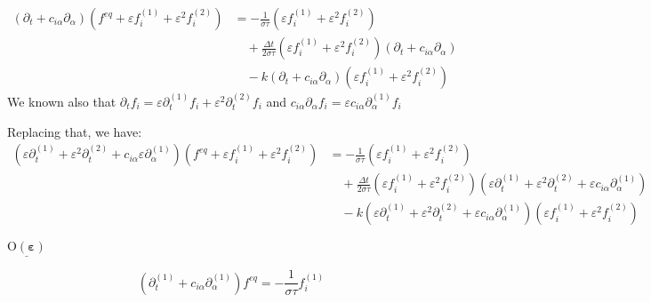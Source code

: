 \documentclass{article}
\newcommand{\Omicron}{\mathrm{O}}
\begin{document}
\begin{equation}
    \begin{aligned}
        ( \partial _{t} + c_{i\alpha } \partial _{\alpha })\left( f^{eq} + \varepsilon f_{i}^{( 1)} + \varepsilon ^{2} f_{i}^{( 2)}\right) 
        &= -\frac{1}{\sigma\tau }\left( \varepsilon f_{i}^{( 1)} + \varepsilon ^{2} f_{i}^{( 2)}\right) \\
        &\quad + \frac{ \Delta t}{2 \sigma\tau }\left( \varepsilon f_{i}^{( 1)} + \varepsilon ^{2} f_{i}^{( 2)}\right)( \partial _{t} + c_{i\alpha } \partial _{\alpha }) \\
        &\quad - k( \partial _{t} + c_{i\alpha } \partial _{\alpha })\left( \varepsilon f_{i}^{( 1)} + \varepsilon ^{2} f_{i}^{( 2)}\right)
    \end{aligned}
\end{equation}
We known also that $\partial _{t} f_{i} = \varepsilon \partial _{t}^{( 1)} f_{i} +\varepsilon ^{2} \partial _{t}^{( 2)} f_{i}$
and $c_{i\alpha } \partial _{\alpha } f_{i} =\varepsilon c_{i\alpha } \partial _{\alpha }^{( 1)} f_{i}$

Replacing that, we have:
\begin{equation}
    \begin{aligned}
        \left( \varepsilon \partial_{t}^{(1)} + \varepsilon^{2} \partial_{t}^{(2)} + c_{i\alpha} \varepsilon \partial_{\alpha}^{(1)} \right) 
        \left( f^{eq} + \varepsilon f_{i}^{(1)} + \varepsilon^{2} f_{i}^{(2)} \right) 
        &= -\frac{1}{\sigma\tau} \left( \varepsilon f_{i}^{(1)} + \varepsilon^{2} f_{i}^{(2)} \right) \\
        &\quad + \frac{\Delta t}{2\sigma\tau} \left( \varepsilon f_{i}^{(1)} + \varepsilon^{2} f_{i}^{(2)} \right) 
        \left( \varepsilon \partial_{t}^{(1)} + \varepsilon^{2} \partial_{t}^{(2)} + \varepsilon c_{i\alpha} \partial_{\alpha}^{(1)} \right) \\
        &\quad - k \left( \varepsilon \partial_{t}^{(1)} + \varepsilon^{2} \partial_{t}^{(2)} + \varepsilon c_{i\alpha} \partial_{\alpha}^{(1)} \right) 
        \left( \varepsilon f_{i}^{(1)} + \varepsilon^{2} f_{i}^{(2)} \right)
    \end{aligned}
\end{equation}

$\underline{\boldsymbol{\Omicron ( \varepsilon )}}$

\begin{equation*}
    \left( \partial _{t}^{( 1)} +c_{i\alpha } \partial _{\alpha }^{( 1)}\right) f^{eq} =-\frac{1}{\sigma\tau } f_{i}^{( 1)}
\end{equation*}
\end{document}
